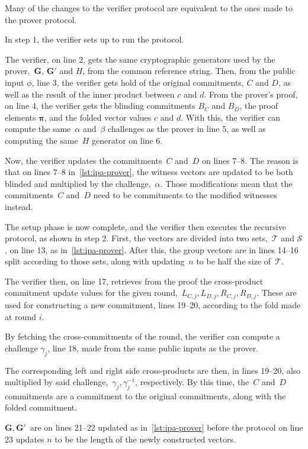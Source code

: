 Many of the changes to the verifier protocol are equivalent to the ones made to the prover protocol.

In step 1, the verifier sets up to run the protocol.

The verifier, on line 2, gets the same cryptographic generators used by the prover,~$\mathbf{G}$, $\mathbf{G}'$ and $H$, from the common reference string.
Then, from the public input $\phi$, line 3, the verifier gets hold of the original commitments, $C$ and $D$, as well as the result of the inner product between $c$ and $d$.
From the prover's proof, on line 4, the verifier gets the blinding commitments $B_C$ and $B_D$, the proof elements $\mathbf{\pi}$, and the folded vector values $c$ and $d$.
With this, the verifier can compute the same~$\alpha$ and~$\beta$ challenges as the prover in line 5, as well as computing the same~$H$ generator on line 6.

Now, the verifier updates the commitments~$C$ and~$D$ on lines 7--8.
The reason is that on lines 7--8 in~\autoref{lst:ipa-prover}, the witness vectors are updated to be both blinded and multiplied by the challenge,~$\alpha$.
Those modifications mean that the commitments~$C$ and~$D$ need to be commitments to the modified witnesses instead.

The setup phase is now complete, and the verifier then executes the recursive protocol, as shown in step 2.
First, the vectors are divided into two sets,~$\mathbf{\mathcal{T}}$ and $\mathbf{\mathcal{S}}$, on line 13, as in~\autoref{lst:ipa-prover}.
After this, the group vectors are in lines 14--16 split according to those sets, along with updating~$n$ to be half the size of~$\mathbf{\mathcal{T}}$.

The verifier then, on line 17, retrieves from the proof the cross-product commitment update values for the given round,~$L_{C,j},L_{D,j},R_{C,j},R_{D,j}$.
These are used for constructing a new commitment, lines 19--20, according to the fold made at round $i$.

By fetching the cross-commitments of the round, the verifier can compute a challenge $\gamma_j$, line 18, made from the same public inputs as the prover.

The corresponding left and right side cross-products are then, in lines 19--20, also multiplied by said challenge,~$\gamma_j,\gamma_j^{-1}$, respectively.
By this time, the~$C$ and~$D$ commitments are a commitment to the original commitments, along with the folded commitment.

$\mathbf{G,G'}$~are on lines 21--22 updated as in~\autoref{lst:ipa-prover} before the protocol on line 23 updates $n$ to be the length of the newly constructed vectors.

